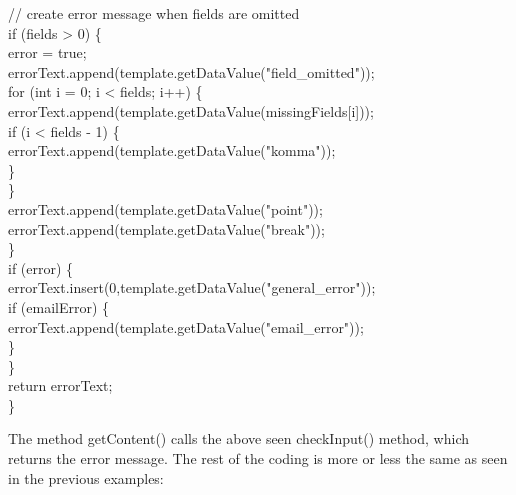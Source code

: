 \begin{java}
\jtabe        // create error message when fields are omitted\\
\jtabe        if (fields > 0) \{\\
\jtabf                error = true;\\
\jtabf                errorText.append(template.getDataValue("field\_omitted"));\\
\jtabf                for (int i = 0; i < fields; i++) \{\\
\jtabf                        errorText.append(template.getDataValue(missingFields[i]));\\
\jtabf                        if (i < fields - 1) \{\\
\jtabf                        errorText.append(template.getDataValue("komma"));\\
\jtabf                        \}\\
\jtabf                \}\\
\jtabf                errorText.append(template.getDataValue("point"));\\
\jtabf                errorText.append(template.getDataValue("break"));\\
\jtabe        \}\\
\jtabe        if (error) \{\\
\jtabf        errorText.insert(0,template.getDataValue("general\_error"));\\
\jtabf                if (emailError) \{\\
\jtabe        errorText.append(template.getDataValue("email\_error"));\\
\jtabf                \}\\
\jtabe        \}\\
\jtabe        return errorText;\\
\}\\
\end{java}

The method {\meth getContent()} calls the above seen {\meth checkInput()} method, which
returns the error message. The rest of the coding is more or less the
same as seen in the previous examples:

